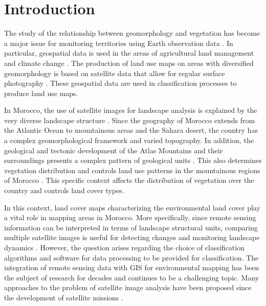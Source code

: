 \documentclass[geomatics,article,submit,pdftex,moreauthors]{Definitions/mdpi}
\begin{document}
\section{Introduction}

The study of the relationship between geomorphology and vegetation has become a major issue for monitoring territories using Earth observation data \cite{Corenblit,Muir,Pu,Cary01091990}. In particular, geospatial data is used in the areas of agricultural land management and climate change \cite{Ahmadian03052016,Lemenkova202412,IMTIAZ2024109172}. The production of land use maps on areas with diversified geomorphology is based on satellite data that allow for regular surface photography \cite{JOHANSSON01011978}. These geospatial data are used in classification processes to produce land use maps. 

In Morocco, the use of satellite images for landscape analysis is explained by the very diverse landscape structure \cite{Sahrane13122022,Marco04032021,Aouraghe01032010}. Since the geography of Morocco extends from the Atlantic Ocean to mountainous areas and the Sahara desert, the country has a complex geomorphological framework and varied topography. In addition, the geological and tectonic development of the Atlas Mountains and their surroundings presents a complex pattern of geological units \cite{Benvenuti31122024,Ouallali03072020,Khalloufi01032010}. This also determines vegetation distribution and controls land use patterns in the mountainous regions of Morocco \cite{ALIELOMAIRI2024101321}. This specific context affects the distribution of vegetation over the country and controls land cover types.

In this context, land cover maps characterizing the environmental land cover play a vital role in mapping areas in Morocco. More specifically, since remote sensing information can be interpreted in terms of landscape structural units, comparing multiple satellite images is useful for detecting changes and monitoring landscape dynamics \cite{CAI2023103226,Lemenkova202405,XIONG2022109132}. However, the question arises regarding the choice of classification algorithms and software for data processing to be provided for classification. The integration of remote sensing data with GIS for environmental mapping has been the subject of research for decades and continues to be a challenging topic. Many approaches to the problem of satellite image analysis have been proposed since the development of satellite missions \cite{NOY2023103377,Lemenkova202403,Su02062020,Potter18102014,Lemenkova202402}.
\end{document}
